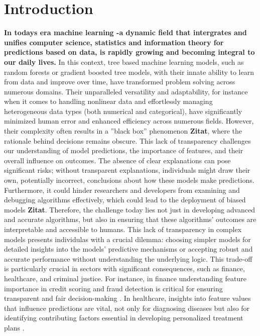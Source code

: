 \documentclass[12pt]{article}
\begin{document}
\section{Introduction}
\textbf{In todays era machine learning -a dynamic field that intergrates and unifies computer science, statistics and information theory for predictions based on data, is rapidly growing and becoming integral to our daily lives. }%
In this context, tree based machine learning models, such as random forests or gradient boosted tree models, with their innate ability to learn from data and improve over time, have transformed problem solving across numerous domains.
Their unparalleled versatility and adaptability, for instance when it comes to handling nonlinear data and effortlessly managing heterogeneous data types (both numerical and categorical), have significantly minimized human error and enhanced efficiency across numerous fields. %
However, their complexity often results in a ”black box” phenomenon \textbf{Zitat}, where the rationale behind decisions remains obscure.
This lack of transparency challenges our understanding of model predictions, the importance of features, and their overall influence on outcomes.
The absence of clear explanations can pose significant risks; without transparent explanations, individuals might draw their own, potentially incorrect, conclusions about how these models make predictions. Furthermore, it could hinder researchers and developers from examining and debugging algorithms effectively, which could lead to the deployment of biased models \textbf{Zitat}.
Therefore, the challenge today lies not just in developing advanced and accurate algorithms, but also in ensuring that these algorithms' outcomes are interpretable and accessible to humans.
This lack of transparency in complex models presents individulas with a crucial dilemma: choosing simpler models for detailed insights into the models’ predictive mechanisms or accepting robust and accurate performance without understanding the underlying logic. \cite{molnar2022}
This trade-off is particularly crucial in sectors with significant consequences, such as finance, healthcare, and criminal justice.
For instance, in finance understanding feature importance in credit scoring and fraud detection is critical for ensuring transparent and fair decision-making \cite{KVAMME2018207}.
In healthcare, insights into feature values that influence predictions are vital, not only for diagnosing diseases but also for identifying contributing factors essential in developing personalized treatment plans \cite{Elish2020ASO}.
\end{document}
